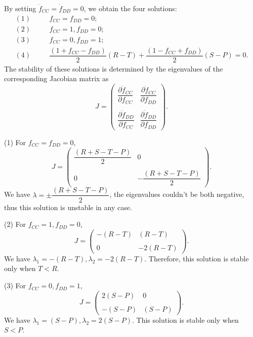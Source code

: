 \documentclass[showpacs,superscriptaddress,reprint,nofootinbib,amsmath,amssymb,aps,pre]{revtex4-1}
\begin{document}
\begin{widetext}
By setting $\dot{f}_{CC}=\dot{f}_{DD}=0$, we obtain the four solutions:
\begin{eqnarray}
(1) &\quad & f_{CC}=f_{DD}=0; \label{eq:MF_s1}\\
(2) &\quad & f_{CC}=1, f_{DD}=0; \label{eq:MF_s2}\\
(3) &\quad & f_{CC}=0, f_{DD}=1; \label{eq:MF_s3}\\
(4) &\quad & \dfrac{(1+f_{CC}-f_{DD})}{2}(R-T)+\dfrac{(1-f_{CC}+f_{DD})}{2}(S-P)=0. \label{eq:MF_s4}
\end{eqnarray}
The stability of these solutions is determined by the eigenvalues of the corresponding Jacobian matrix as
\begin{equation}
J=\begin{pmatrix}
\dfrac{\partial \dot{f}_{CC}}{\partial f_{CC}} & \dfrac{\partial \dot{f}_{CC}}{\partial f_{DD}} \\
\\
\dfrac{\partial \dot{f}_{DD}}{\partial f_{CC}} & \dfrac{\partial \dot{f}_{DD}}{\partial f_{DD}} 
\end{pmatrix}.
\end{equation}

(1) For $f_{CC}=f_{DD}=0$,
\small
\begin{equation}
J=\begin{pmatrix}
\dfrac{(R+S-T-P)}{2} & 0 \\
\\
0&  -\dfrac{(R+S-T-P)}{2}
\end{pmatrix}.
\end{equation}
\normalsize
We have $\lambda=\pm\dfrac{(R+S-T-P)}{2}$, the eigenvalues couldn't be both negative, thus this solution is unstable in any case.

(2) For $f_{CC}=1,f_{DD}=0$,
\small
\begin{equation}
J=\begin{pmatrix}
-(R-T) & (R-T) \\
\\
0& -2(R-T)
\end{pmatrix}.
\end{equation}
\normalsize
We have $\lambda_{1}=-(R-T),\lambda_{2}=-2(R-T)$. Therefore, this solution is stable only when $T<R$.

(3) For $f_{CC}=0,f_{DD}=1$,
\small
\begin{equation}
J=\begin{pmatrix}
2(S-P) & 0 \\
\\
-(S-P)& (S-P)
\end{pmatrix}.
\end{equation}
\normalsize
We have $\lambda_{1}=(S-P),\lambda_{2}=2(S-P)$. This solution is stable only when $S<P$.


\end{widetext}
\end{document}
